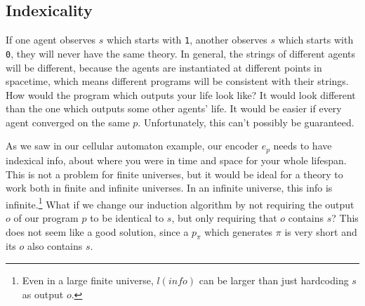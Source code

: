 
\newpage

\subsection{Indexicality}

If one agent observes $s$ which starts with \texttt{1}, another observes $s$ which starts with \texttt{0}, they will never have the same theory.
In general, the strings of different agents will be different, because the agents are instantiated at different points in spacetime, which means different programs will be consistent with their strings.
How would the program which outputs your life look like?
It would look different than the one which outputs some other agents' life.
It would be easier if every agent converged on the same $p$.
Unfortunately, this can't possibly be guaranteed.

As we saw in our cellular automaton example, our encoder $e_p$ needs to have indexical info, about where you were in time and space for your whole lifespan.
This is not a problem for finite universes, but it would be ideal for a theory to work both in finite and infinite universes.
In an infinite universe, this info is infinite.\footnote{Even in a large finite universe, $l(info)$ can be larger than just hardcoding $s$ as output $o$.}
What if we change our induction algorithm by not requiring the output $o$ of our program $p$ to be identical to $s$, but only requiring that $o$ contains $s$?
This does not seem like a good solution, since a $p_\pi$ which generates $\pi$ is very short and its $o$ also contains $s$.

